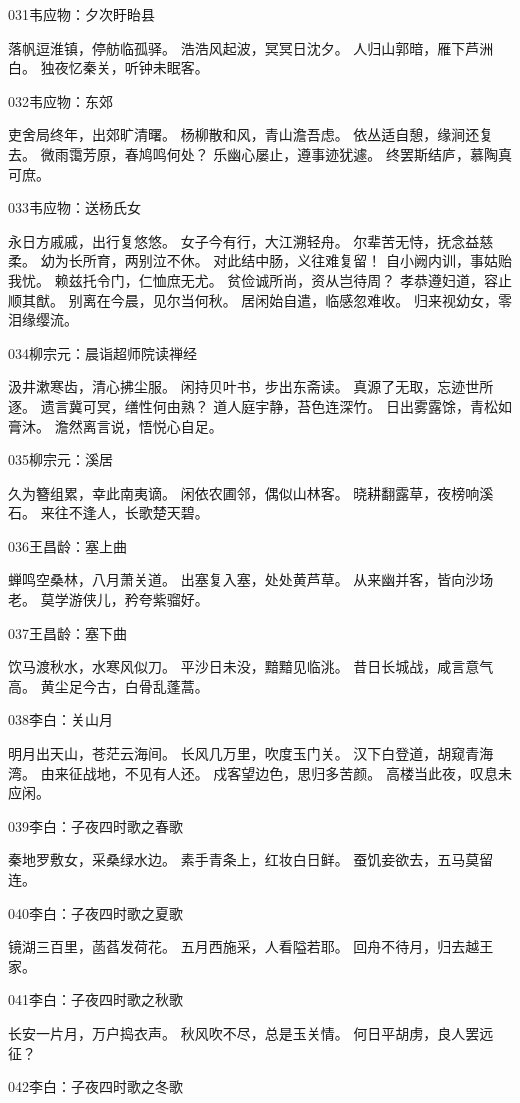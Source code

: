 031韦应物：夕次盱眙县

落帆逗淮镇，停舫临孤驿。
浩浩风起波，冥冥日沈夕。
人归山郭暗，雁下芦洲白。
独夜忆秦关，听钟未眠客。

032韦应物：东郊

吏舍局终年，出郊旷清曙。
杨柳散和风，青山澹吾虑。
依丛适自憩，缘涧还复去。
微雨霭芳原，春鸠鸣何处？
乐幽心屡止，遵事迹犹遽。
终罢斯结庐，慕陶真可庶。

033韦应物：送杨氏女

永日方戚戚，出行复悠悠。
女子今有行，大江溯轻舟。
尔辈苦无恃，抚念益慈柔。
幼为长所育，两别泣不休。
对此结中肠，义往难复留！
自小阙内训，事姑贻我忧。
赖兹托令门，仁恤庶无尤。
贫俭诚所尚，资从岂待周？
孝恭遵妇道，容止顺其猷。
别离在今晨，见尔当何秋。
居闲始自遣，临感忽难收。
归来视幼女，零泪缘缨流。

034柳宗元：晨诣超师院读禅经

汲井漱寒齿，清心拂尘服。
闲持贝叶书，步出东斋读。
真源了无取，忘迹世所逐。
遗言冀可冥，缮性何由熟？
道人庭宇静，苔色连深竹。
日出雾露馀，青松如膏沐。
澹然离言说，悟悦心自足。

035柳宗元：溪居

久为簪组累，幸此南夷谪。
闲依农圃邻，偶似山林客。
晓耕翻露草，夜榜响溪石。
来往不逢人，长歌楚天碧。

036王昌龄：塞上曲

蝉鸣空桑林，八月萧关道。
出塞复入塞，处处黄芦草。
从来幽并客，皆向沙场老。
莫学游侠儿，矜夸紫骝好。

037王昌龄：塞下曲

饮马渡秋水，水寒风似刀。
平沙日未没，黯黯见临洮。
昔日长城战，咸言意气高。
黄尘足今古，白骨乱蓬蒿。

038李白：关山月

明月出天山，苍茫云海间。
长风几万里，吹度玉门关。
汉下白登道，胡窥青海湾。
由来征战地，不见有人还。
戍客望边色，思归多苦颜。
高楼当此夜，叹息未应闲。

039李白：子夜四时歌之春歌

秦地罗敷女，采桑绿水边。
素手青条上，红妆白日鲜。
蚕饥妾欲去，五马莫留连。

040李白：子夜四时歌之夏歌

镜湖三百里，菡萏发荷花。
五月西施采，人看隘若耶。
回舟不待月，归去越王家。

041李白：子夜四时歌之秋歌

长安一片月，万户捣衣声。
秋风吹不尽，总是玉关情。
何日平胡虏，良人罢远征？

042李白：子夜四时歌之冬歌


